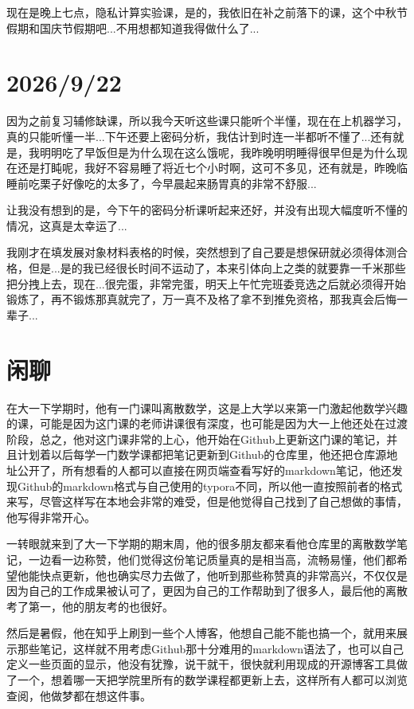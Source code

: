 现在是晚上七点，隐私计算实验课，是的，我依旧在补之前落下的课，这个中秋节假期和国庆节假期吧...不用想都知道我得做什么了...

\section*{2026/9/22}

因为之前复习辅修缺课，所以我今天听这些课只能听个半懂，现在在上机器学习，真的只能听懂一半...下午还要上密码分析，我估计到时连一半都听不懂了...还有就是，我明明吃了早饭但是为什么现在这么饿呢，我昨晚明明睡得很早但是为什么现在还是打盹呢，我好不容易睡了将近七个小时啊，这可不多见，还有就是，昨晚临睡前吃栗子好像吃的太多了，今早晨起来肠胃真的非常不舒服...

让我没有想到的是，今下午的密码分析课听起来还好，并没有出现大幅度听不懂的情况，这真是太幸运了...

我刚才在填发展对象材料表格的时候，突然想到了自己要是想保研就必须得体测合格，但是...是的我已经很长时间不运动了，本来引体向上之类的就要靠一千米那些把分拽上去，现在...很完蛋，非常完蛋，明天上午忙完班委竞选之后就必须得开始锻炼了，再不锻炼那真就完了，万一真不及格了拿不到推免资格，那我真会后悔一辈子...
\section*{闲聊}

在大一下学期时，他有一门课叫离散数学，这是上大学以来第一门激起他数学兴趣的课，可能是因为这门课的老师讲课很有深度，也可能是因为大一上他还处在过渡阶段，总之，他对这门课非常的上心，他开始在Github上更新这门课的笔记，并且计划着以后每学一门数学课都把笔记更新到Github的仓库里，他还把仓库源地址公开了，所有想看的人都可以直接在网页端查看写好的markdown笔记，他还发现Github的markdown格式与自己使用的typora不同，所以他一直按照前者的格式来写，尽管这样写在本地会非常的难受，但是他觉得自己找到了自己想做的事情，他写得非常开心。

一转眼就来到了大一下学期的期末周，他的很多朋友都来看他仓库里的离散数学笔记，一边看一边称赞，他们觉得这份笔记质量真的是相当高，流畅易懂，他们都希望他能快点更新，他也确实尽力去做了，他听到那些称赞真的非常高兴，不仅仅是因为自己的工作成果被认可了，更因为自己的工作帮助到了很多人，最后他的离散考了第一，他的朋友考的也很好。

然后是暑假，他在知乎上刷到一些个人博客，他想自己能不能也搞一个，就用来展示那些笔记，这样就不用考虑Github那十分难用的markdown语法了，也可以自己定义一些页面的显示，他没有犹豫，说干就干，很快就利用现成的开源博客工具做了一个，想着哪一天把学院里所有的数学课程都更新上去，这样所有人都可以浏览查阅，他做梦都在想这件事。

